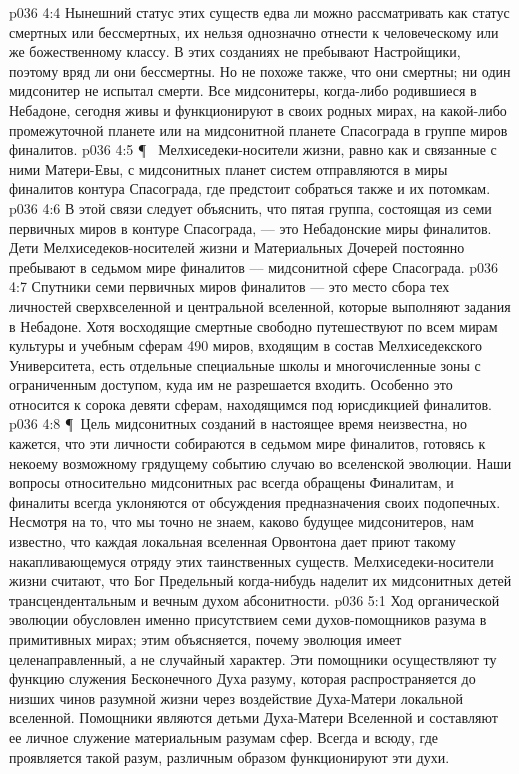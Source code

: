 \vs p036 4:4 Нынешний статус этих существ едва ли можно рассматривать как статус смертных или бессмертных, их нельзя однозначно отнести к человеческому или же божественному классу. В этих созданиях не пребывают Настройщики, поэтому вряд ли они бессмертны. Но не похоже также, что они смертны; ни один мидсонитер не испытал смерти. Все мидсонитеры, когда\hyp{}либо родившиеся в Небадоне, сегодня живы и функционируют в своих родных мирах, на какой\hyp{}либо промежуточной планете или на мидсонитной планете Спасограда в группе миров финалитов.
\vs p036 4:5 \P\  Мелхиседеки\hyp{}носители жизни, равно как и связанные с ними Матери\hyp{}Евы, с мидсонитных планет систем отправляются в миры финалитов контура Спасограда, где предстоит собраться также и их потомкам.
\vs p036 4:6 В этой связи следует объяснить, что пятая группа, состоящая из семи первичных миров в контуре Спасограда, --- это Небадонские миры финалитов. Дети Мелхиседеков\hyp{}носителей жизни и Материальных Дочерей постоянно пребывают в седьмом мире финалитов --- мидсонитной сфере Спасограда.
\vs p036 4:7 Спутники семи первичных миров финалитов --- это место сбора тех личностей сверхвселенной и центральной вселенной, которые выполняют задания в Небадоне. Хотя восходящие смертные свободно путешествуют по всем мирам культуры и учебным сферам 490 миров, входящим в состав Мелхиседекского Университета, есть отдельные специальные школы и многочисленные зоны с ограниченным доступом, куда им не разрешается входить. Особенно это относится к сорока девяти сферам, находящимся под юрисдикцией финалитов.
\vs p036 4:8 \P\ Цель мидсонитных созданий в настоящее время неизвестна, но кажется, что эти личности собираются в седьмом мире финалитов, готовясь к некоему возможному грядущему событию случаю во вселенской эволюции. Наши вопросы относительно мидсонитных рас всегда обращены Финалитам, и финалиты всегда уклоняются от обсуждения предназначения своих подопечных. Несмотря на то, что мы точно не знаем, каково будущее мидсонитеров, нам известно, что каждая локальная вселенная Орвонтона дает приют такому накапливающемуся отряду этих таинственных существ. Мелхиседеки\hyp{}носители жизни считают, что Бог Предельный когда\hyp{}нибудь наделит их мидсонитных детей трансцендентальным и вечным духом абсонитности.
\vs p036 5:1 Ход органической эволюции обусловлен именно присутствием семи духов\hyp{}помощников разума в примитивных мирах; этим объясняется, почему эволюция имеет целенаправленный, а не случайный характер. Эти помощники осуществляют ту функцию служения Бесконечного Духа разуму, которая распространяется до низших чинов разумной жизни через воздействие Духа\hyp{}Матери локальной вселенной. Помощники являются детьми Духа\hyp{}Матери Вселенной и составляют ее личное служение материальным разумам сфер. Всегда и всюду, где проявляется такой разум, различным образом функционируют эти духи.
